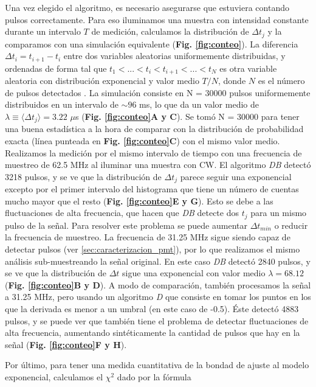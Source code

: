Una vez elegido el algoritmo, es necesario asegurarse que estuviera contando pulsos correctamente.
Para eso iluminamos una muestra con intensidad constante durante un intervalo $T$ de medición, calculamos la distribución de $\Delta t_j$ y la comparamos con una simulación equivalente (\textbf{Fig. \ref{fig:conteo}}).
La diferencia $\Delta t_i = t_{i+1} - t_i$ entre dos variables aleatorias uniformemente distribuidas, y ordenadas de forma tal que $t_1 < ... < t_i < t_{i+1} < ... < t_N $ es otra variable aleatoria con distribución exponencial y valor medio $T/N$, donde $N$ es el número de pulsos detectados \cite{dasuniform}.
La simulación consiste en N = 30000 pulsos uniformemente distribuidos en un intervalo de $\sim 96$ ms, lo que da un valor medio de $\lambda \equiv \langle \Delta t_j \rangle = 3.22$ $\mu$s (\textbf{Fig. \ref{fig:conteo}A y C}).
Se tomó N = 30000 para tener una buena estadística a la hora de comparar con la distribución de probabilidad exacta (línea punteada en \textbf{Fig. \ref{fig:conteo}C}) con el mismo valor medio.
Realizamos la medición por el mismo intervalo de tiempo con una frecuencia de muestreo de 62.5 MHz al iluminar una muestra con CW.
El algoritmo \textit{DB} detectó 3218 pulsos, y se ve que la distribución de $\Delta t_j$ parece seguir una exponencial excepto por el primer intervalo del histograma que tiene un número de cuentas mucho mayor que el resto (\textbf{Fig. \ref{fig:conteo}E y G}).
Esto se debe a las fluctuaciones de alta frecuencia, que hacen que \textit{DB} detecte dos $t_j$ para un mismo pulso de la señal. 
Para resolver este problema se puede aumentar $\Delta t_{min}$ o reducir la frecuencia de muestreo.
La frecuencia de 31.25 MHz sigue siendo capaz de detectar pulsos (ver \ref{sec:caracterizacion_pmt}), por lo que realizamos el mismo análisis sub-muestreando la señal original.
En este caso \textit{DB} detectó 2840 pulsos, y se ve que la distribución de $\Delta t$ sigue una exponencial con valor medio $\lambda = 68.12$ (\textbf{Fig. \ref{fig:conteo}B y D}).
A modo de comparación, también procesamos la señal a 31.25 MHz, pero usando un algoritmo \textit{D} que consiste en tomar los puntos en los que la derivada es menor a un umbral (en este caso de -0.5).
Éste detectó 4883 pulsos, y se puede ver que también tiene el problema de detectar fluctuaciones de alta frecuencia, aumentando sintéticamente la cantidad de pulsos que hay en la señal (\textbf{Fig. \ref{fig:conteo}F y H}).

Por último, para tener una medida cuantitativa de la bondad de ajuste al modelo exponencial, calculamos el $\chi^2$ dado por la fórmula 

